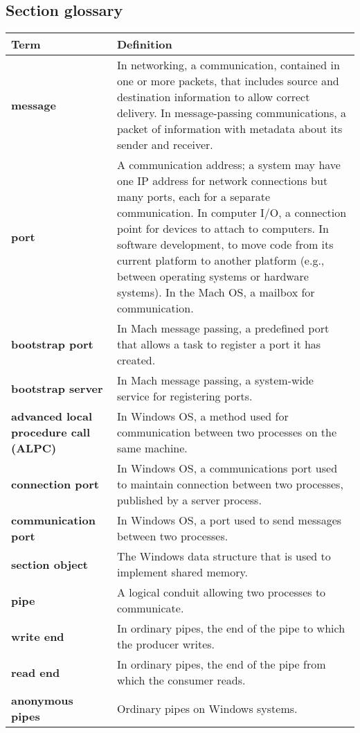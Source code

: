 \subsection*{Section glossary}
\centering
\begin{tabular}{>{\raggedright}p{} >{\raggedright\arraybackslash}p{}}
\toprule
\textbf{Term} & \textbf{Definition} \\
\midrule
\textbf{message} & In networking, a communication, contained in one or more packets, that includes source and destination information to allow correct delivery. In message-passing communications, a packet of information with metadata about its sender and receiver. \\
\textbf{port} & A communication address; a system may have one IP address for network connections but many ports, each for a separate communication. In computer I/O, a connection point for devices to attach to computers. In software development, to move code from its current platform to another platform (e.g., between operating systems or hardware systems). In the Mach OS, a mailbox for communication. \\
\textbf{bootstrap port} & In Mach message passing, a predefined port that allows a task to register a port it has created. \\
\textbf{bootstrap server} & In Mach message passing, a system-wide service for registering ports. \\
\textbf{advanced local procedure call (ALPC)} & In Windows OS, a method used for communication between two processes on the same machine. \\
\textbf{connection port} & In Windows OS, a communications port used to maintain connection between two processes, published by a server process. \\
\textbf{communication port} & In Windows OS, a port used to send messages between two processes. \\
\textbf{section object} & The Windows data structure that is used to implement shared memory. \\
\textbf{pipe} & A logical conduit allowing two processes to communicate. \\
\textbf{write end} & In ordinary pipes, the end of the pipe to which the producer writes. \\
\textbf{read end} & In ordinary pipes, the end of the pipe from which the consumer reads. \\
\textbf{anonymous pipes} & Ordinary pipes on Windows systems. \\
\bottomrule
\end{tabular}
\vspace{\baselineskip}
